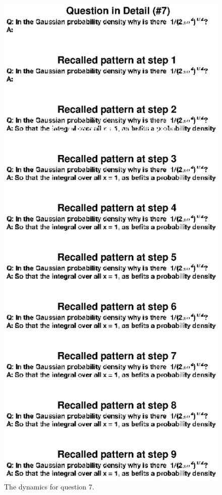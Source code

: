 \documentclass[11pt, oneside]{article}
\begin{document}
  \begin{figure}[H]
  \includegraphics[width=1\textwidth]{q7detail.eps}
  \caption{The dynamics for question 7.}
  \label{fig:q7detail}
  \end{figure}
\end{document}
